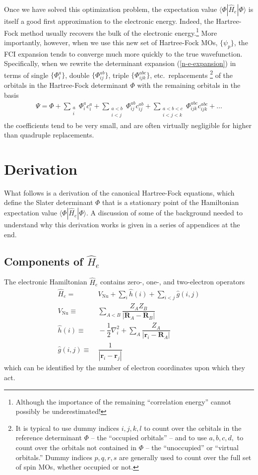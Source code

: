 \documentclass[11pt]{article}
\newcommand{\F}{\ensuremath{\Phi}}
\newcommand{\y}{\ensuremath{\psi}}
\newcommand{\Y}{\ensuremath{\Psi}}
\newcommand{\op}[1]{\ensuremath{ \hat{#1} } }
\newcommand{\Nu}{\ensuremath{\mathrm{Nu}}}
\newcommand{\ld}{\ensuremath{\ldots}}
\newcommand{\bo}[1]{\ensuremath{\mathbf{#1}}}
\newcommand{\fr}[2]{\ensuremath{ \dfrac{#1}{#2} }}
\newcommand{\ip}[1]{\ensuremath{\langle #1\rangle}}
\newcommand{\miniar}[1]{\ensuremath{\begin{smallmatrix}#1\end{smallmatrix}}}
\theoremstyle{indented}
\begin{document}
Once we have solved this optimization problem, the expectation value $\ip{\F|\op{H}_e|\F}$ is itself a good first approximation to the electronic energy.
Indeed, the Hartree-Fock method usually recovers the bulk of the electronic energy.\footnote{Although the importance of the remaining ``correlation energy'' cannot possibly be underestimated!}
More importantly, however, when we use this new set of Hartree-Fock MOs, $\{\y_p\}$, the FCI expansion tends to converge much more quickly to the true wavefunction.
Specifically, when we rewrite the determinant expansion (\ref{n-e-expansion}) in terms of single $\{\F_i^a\}$, double $\{\F_{ij}^{ab}\}$, triple $\{\F_{ijk}^{abc}\}$, etc.\ replacements \footnote{It is typical to use dummy indices $i,j,k,l$ to count over the orbitals in the reference determinant $\F$ -- the ``occupied orbitals'' -- and to use $a,b,c,d,$ to count over the orbitals not contained in $\F$ -- the ``unoccupied'' or ``virtual orbitals.''  Dummy indices $p,q,r,s$ are generally used to count over the full set of spin MOs, whether occupied or not.} of the orbitals in the Hartree-Fock determinant $\F$ with the remaining orbitals in the basis
\begin{align}
	\Y
=
	\F
+
	\sum_{\miniar{a\\i}}
	\F_i^ac_i^a
+
	\sum_{\miniar{a<b\\i<j}}
	\F_{ij}^{ab}c_{ij}^{ab}
+
	\sum_{\miniar{a<b<c\\i<j<k}}
	\F_{ijk}^{abc}c_{ijk}^{abc}
+\ld
\end{align}
the coefficients tend to be very small, and are often virtually negligible for higher than quadruple replacements.

\section*{Derivation}
What follows is a derivation of the canonical Hartree-Fock equations, which define the Slater determinant $\F$ that is a stationary point of the Hamiltonian expectation value $\ip{\F|\op{H}_e|\F}$.
A discussion of some of the background needed to understand why this derivation works is given in a series of appendices at the end.

\subsection*{Components of $\op{H}_e$}
The electronic Hamiltonian $\op{H}_e$ contains zero-, one-, and two-electron operators
\begin{align}
	\op{H}_e
=&\
	V_\Nu
+
	\sum_i
	\op{h}(i)
+
	\sum_{i<j}
	\op{g}(i,j)
\\
	V_\Nu
\equiv&\
	\sum_{A<B}\fr{Z_AZ_B}{|\bo{R}_A-\bo{R}_B|}
\\
	\op{h}(i)
\equiv&\
-\fr{1}{2}
	\nabla_i^2
+\sum_A
	\fr{Z_A}{|\bo{r}_i-\bo{R}_A|}
\\
	\op{g}(i,j)
\equiv&\
	\fr{1}{|\bo{r}_i-\bo{r}_j|}
\end{align}
which can be identified by the number of electron coordinates upon which they act.
\end{document}
